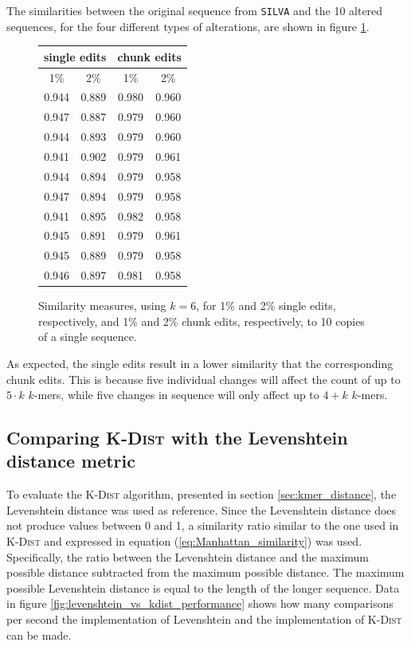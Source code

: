 The similarities between the original sequence from \texttt{SILVA} and the 10
altered sequences, for the four different types of alterations, are shown in
figure \ref{fig:altered_seqs_similarities}.

\begin{figure}[H]
  \centering
  \begin{tabular}{c|c||c|c}
    \multicolumn{2}{c||}{single edits}  & \multicolumn{2}{c}{chunk edits} \\
    \hline\hline
    1\%   &   2\%                   &   1\%   &   2\% \\
    \hline
    0.944   & 0.889                     & 0.980     & 0.960 \\
    0.947   & 0.887                     & 0.979     & 0.960 \\
    0.944   & 0.893                     & 0.979     & 0.960 \\
    0.941   & 0.902                     & 0.979     & 0.961 \\
    0.944   & 0.894                     & 0.979     & 0.958 \\
    0.947   & 0.894                     & 0.979     & 0.958 \\
    0.941   & 0.895                     & 0.982     & 0.958 \\
    0.945   & 0.891                     & 0.979     & 0.961 \\
    0.945   & 0.889                     & 0.979     & 0.958 \\
    0.946   & 0.897                     & 0.981     & 0.958
  \end{tabular}
  \caption{Similarity measures, using $k=6$, for 1\% and 2\% single edits, respectively,
    and 1\% and 2\% chunk edits, respectively, to 10 copies of a single
    sequence.}
  \label{fig:altered_seqs_similarities}
\end{figure}

As expected, the single edits result in a lower similarity that the
corresponding chunk edits. This is because five individual changes will affect
the count of up to $5 \cdot k$ $k$-mers, while five changes in sequence will
only affect up to $4+k$ $k$-mers.


\subsection{Comparing \textsc{K-Dist} with the Levenshtein distance metric}

To evaluate the \textsc{K-Dist} algorithm, presented in section
\ref{sec:kmer_distance}, the Levenshtein distance was used as reference. Since
the Levenshtein distance does not produce values between 0 and 1, a similarity
ratio similar to the one used in \textsc{K-Dist} and expressed in equation
(\ref{eq:Manhattan_similarity}) was used. Specifically, the ratio between the
Levenshtein distance and the maximum possible distance subtracted from the
maximum possible distance. The maximum possible Levenshtein distance is equal
to the length of the longer sequence. Data in figure \ref{fig:levenshtein_vs_kdist_performance} shows how many comparisons per second the implementation of Levenshtein and the implementation of \textsc{K-Dist} can be made.

